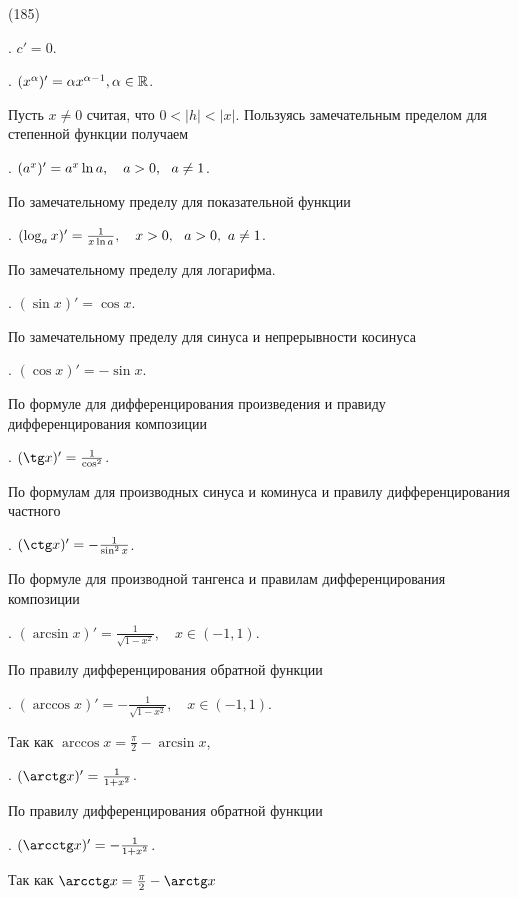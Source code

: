 (185)

. $c' = 0$.

. $(x^\alpha)' = \alpha x^{\alpha - 1}, \alpha \in \mathbb{R}$.

\D Пусть $x \neq 0$ считая, что $0 < |h| < |x|$. Пользуясь замечательным пределом для степенной функции получаем 

. $(a^x)' = a^x \ln a,\quad a > 0,\ \  a \neq 1$.

\D По замечательному пределу для показательной функции 

. $(\log_a x)' = \frac 1{x\ln a},\quad x > 0,\ \  a > 0,\ a \neq 1$.

\D По замечательному пределу для логарифма. 

. $(\sin x)' = \cos x$.

\D По замечательному пределу для синуса и непрерывности косинуса 

. $(\cos x)' = -\sin x$.

\D По формуле для дифференцирования произведения и правиду дифференцирования композиции 

. $(\tg x)' = \frac 1{\cos^2}$.

\D По формулам для производных синуса и коминуса и правилу дифференцирования частного 

. $(\ctg x)' = -\frac 1{\sin^2 x}$.

\D По формуле для производной тангенса и правилам дифференцирования композиции 

. $(\arcsin x)' = \frac 1{\sqrt{1 - x^2}},\quad x \in (-1, 1)$.

\D По правилу дифференцирования обратной функции 

. $(\arccos x)' = -\frac 1{\sqrt{1 - x^2}},\quad x \in (-1, 1)$.

\D Так как $\arccos x = \frac \pi2 -\arcsin x$, 

. $(\arctg x)' = \frac 1{1 + x^2}$.

\D По правилу дифференцирования обратной функции 

. $(\arcctg x)' = -\frac 1{1 + x^2}$.

\D Так как $\arcctg x = \frac\pi2 - \arctg x$ 